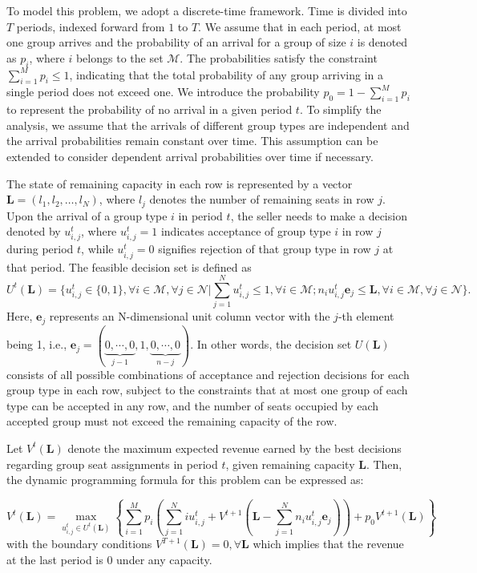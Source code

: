 To model this problem, we adopt a discrete-time framework. Time is divided into $T$ periods, indexed forward from $1$ to $T$. We assume that in each period, at most one group arrives and the probability of an arrival for a group of size $i$ is denoted as $p_i$, where $i$ belongs to the set $\mathcal{M}$. The probabilities satisfy the constraint $\sum_{i=1}^M p_i \leq 1$, indicating that the total probability of any group arriving in a single period does not exceed one. We introduce the probability $p_0 = 1 - \sum_{i=1}^{M} p_i$ to represent the probability of no arrival in a given period $t$. To simplify the analysis, we assume that the arrivals of different group types are independent and the arrival probabilities remain constant over time. This assumption can be extended to consider dependent arrival probabilities over time if necessary.

The state of remaining capacity in each row is represented by a vector $\mathbf{L} = (l_1, l_2, \ldots, l_N)$, where $l_j$ denotes the number of remaining seats in row $j$. Upon the arrival of a group type $i$ in period $t$, the seller needs to make a decision denoted by $u_{i,j}^{t}$, where $u_{i,j}^{t} = 1$ indicates acceptance of group type $i$ in row $j$ during period $t$, while $u_{i,j}^{t} = 0$ signifies rejection of that group type in row $j$ at that period. The feasible decision set is defined as $$U^{t}(\mathbf{L}) = \{u_{i,j}^{t} \in \{0,1\}, \forall i \in \mathcal{M}, \forall j \in \mathcal{N} | \sum_{j=1}^{N} u_{i,j}^{t} \leq 1, \forall i \in \mathcal{M}; n_{i}u_{i,j}^{t}\mathbf{e}_j \leq \mathbf{L}, \forall i \in \mathcal{M}, \forall j \in \mathcal{N}\}.$$ Here, $\mathbf{e}_j$ represents an N-dimensional unit column vector with the $j$-th element being 1, i.e., $\mathbf{e}_j = (\underbrace{0, \cdots, 0}_{j-1}, 1, \underbrace{0, \cdots, 0}_{n-j})$. In other words, the decision set $U(\mathbf{L})$ consists of all possible combinations of acceptance and rejection decisions for each group type in each row, subject to the constraints that at most one group of each type can be accepted in any row, and the number of seats occupied by each accepted group must not exceed the remaining capacity of the row.


Let $V^{t}(\mathbf{L})$ denote the maximum expected revenue earned by the best decisions regarding group seat assignments in period $t$, given remaining capacity $\mathbf{L}$. Then, the dynamic programming formula for this problem can be expressed as:

\begin{equation}\label{DP}
V^{t}(\mathbf{L}) = \max_{u_{i,j}^{t} \in U^{t}(\mathbf{L})}\left\{ \sum_{i=1}^{M} p_i ( \sum_{j=1}^{N} i u_{i,j}^{t} + V^{t+1}(\mathbf{L}- \sum_{j=1}^{N} n_i u_{i,j}^{t}\mathbf{e}_j)) + p_0 V^{t+1}(\mathbf{L})\right\}
\end{equation}
with the boundary conditions $V^{T+1}(\mathbf{L}) = 0, \forall \mathbf{L}$ which implies that the revenue at the last period is 0 under any capacity.

